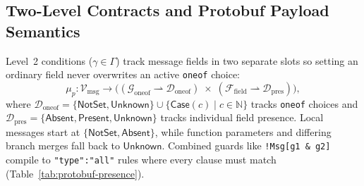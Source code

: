 \subsection{Two-Level Contracts and Protobuf Payload Semantics}
\label{sec:exp-protobuf}

Level~2 conditions ($\gamma \in \Gamma$) track message fields in two separate slots so setting an ordinary field never overwrites an active \texttt{oneof} choice:
\begin{equation}
\label{eq:product-payload}
\mu_p : \mathcal{V}_{\mathrm{msg}} \longrightarrow \bigl((\mathcal{G}_{\mathrm{oneof}} \rightharpoonup \mathcal{D}_{\mathrm{oneof}}) \;\times\; (\mathcal{F}_{\mathrm{field}} \rightharpoonup \mathcal{D}_{\mathrm{pres}})\bigr),
\end{equation}
where $\mathcal{D}_{\mathrm{oneof}} = \{\mathsf{NotSet}, \mathsf{Unknown}\} \cup \{\mathsf{Case}(c) \mid c \in \mathbb{N}\}$ tracks \texttt{oneof} choices and $\mathcal{D}_{\mathrm{pres}} = \{\mathsf{Absent},\allowbreak \mathsf{Present},\allowbreak \mathsf{Unknown}\}$ tracks individual field presence. Local messages start at $\{\mathsf{NotSet}, \mathsf{Absent}\}$, while function parameters and differing branch merges fall back to $\mathsf{Unknown}$. Combined guards like \texttt{!Msg[g1 \& g2]} compile to \texttt{"type":"all"} rules where every clause must match (Table~\ref{tab:protobuf-presence}).

